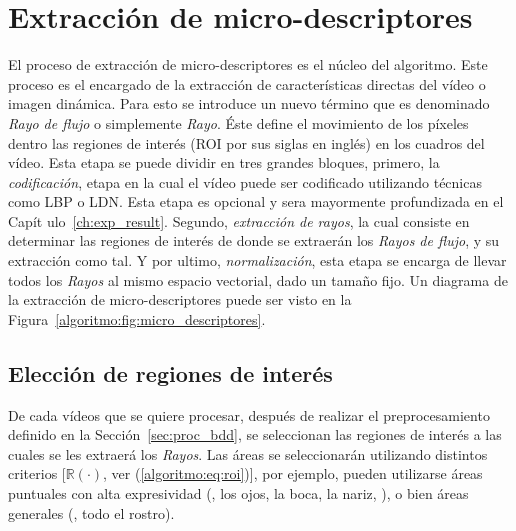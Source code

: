 \section{Extracción de micro-descriptores}
\label{sec:micro_descriptores}
	El proceso de extracción de micro-descriptores es el núcleo del algoritmo. Este proceso es el encargado de la extracción de características directas del vídeo o imagen dinámica. Para esto se introduce un nuevo término que es denominado \textit{Rayo de flujo} o simplemente \textit{Rayo}. Éste define el movimiento de los píxeles dentro las regiones de interés (ROI por sus siglas en inglés) en los cuadros del vídeo. Esta etapa se puede dividir en tres grandes bloques, primero, la \emph{codificación}, etapa en la cual el vídeo puede ser codificado utilizando técnicas como LBP o LDN\@. Esta etapa es opcional y sera mayormente profundizada en el Capít ulo~\ref{ch:exp_result}. Segundo, \emph{extracción de rayos}, la cual consiste en determinar las regiones de interés de donde se extraerán los \textit{Rayos de flujo}, y su extracción como tal. Y por ultimo, \emph{normalización}, esta etapa se encarga de llevar todos los \textit{Rayos} al mismo espacio vectorial, dado un tamaño fijo. Un diagrama de la extracción de micro-descriptores puede ser visto en la Figura~\ref{algoritmo:fig:micro_descriptores}.


	\subsection{Elección de regiones de interés}
	\label{algoritmo:elecc_roi}
	De cada vídeos que se quiere procesar, después de realizar el preprocesamiento definido en la Sección~\ref{sec:proc_bdd}, se seleccionan las regiones de interés a las cuales se les extraerá los \textit{Rayos}. Las áreas se seleccionarán utilizando distintos criterios [$\mathds{R}(\cdot)$, ver (\ref{algoritmo:eq:roi})], por ejemplo, pueden utilizarse áreas puntuales con alta expresividad (\eg, los ojos, la boca, la nariz, \etc), o bien áreas generales (\eg, todo el rostro).
	

